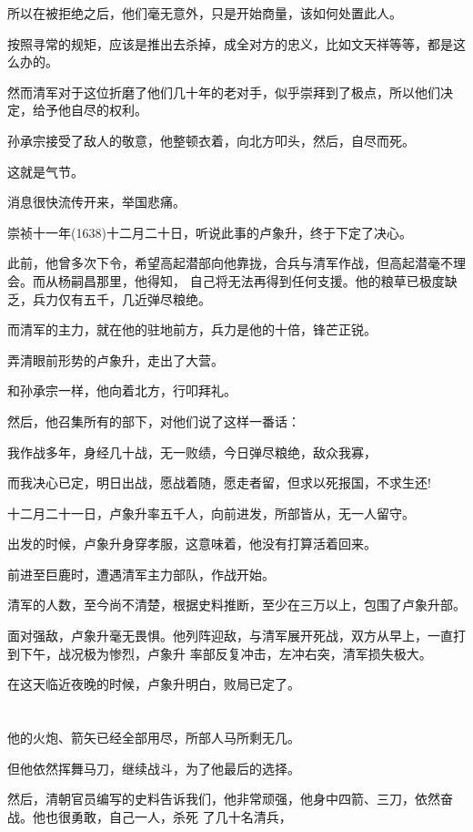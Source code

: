 \documentclass[11pt,a4paper,onecolumn]{article}
\begin{document}
所以在被拒绝之后，他们毫无意外，只是开始商量，该如何处置此人。

按照寻常的规矩，应该是推出去杀掉，成全对方的忠义，比如文天祥等等，都是这么办的。

然而清军对于这位折磨了他们几十年的老对手，似乎崇拜到了极点，所以他们决定，给予他自尽的权利。

孙承宗接受了敌人的敬意，他整顿衣着，向北方叩头，然后，自尽而死。

这就是气节。

消息很快流传开来，举国悲痛。

崇祯十一年(1638)十二月二十日，听说此事的卢象升，终于下定了决心。

此前，他曾多次下令，希望高起潜部向他靠拢，合兵与清军作战，但高起潜毫不理会。而从杨嗣昌那里，他得知，
自己将无法再得到任何支援。他的粮草已极度缺乏，兵力仅有五千，几近弹尽粮绝。

而清军的主力，就在他的驻地前方，兵力是他的十倍，锋芒正锐。

弄清眼前形势的卢象升，走出了大营。

和孙承宗一样，他向着北方，行叩拜礼。

然后，他召集所有的部下，对他们说了这样一番话：

我作战多年，身经几十战，无一败绩，今日弹尽粮绝，敌众我寡，

而我决心已定，明日出战，愿战着随，愿走者留，但求以死报国，不求生还!

十二月二十一日，卢象升率五千人，向前进发，所部皆从，无一人留守。

出发的时候，卢象升身穿孝服，这意味着，他没有打算活着回来。

前进至巨鹿时，遭遇清军主力部队，作战开始。

清军的人数，至今尚不清楚，根据史料推断，至少在三万以上，包围了卢象升部。

面对强敌，卢象升毫无畏惧。他列阵迎敌，与清军展开死战，双方从早上，一直打到下午，战况极为惨烈，卢象升
率部反复冲击，左冲右突，清军损失极大。

在这天临近夜晚的时候，卢象升明白，败局已定了。

\section[\thesection]{}

他的火炮、箭矢已经全部用尽，所部人马所剩无几。

但他依然挥舞马刀，继续战斗，为了他最后的选择。

然后，清朝官员编写的史料告诉我们，他非常顽强，他身中四箭、三刀，依然奋战。他也很勇敢，自己一人，杀死
了几十名清兵，
\end{document}

